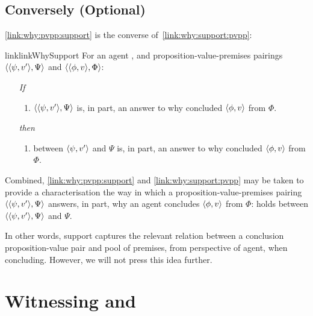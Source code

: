 \subsection[Conversely]{Conversely \hfill (Optional)}

\begin{noteP}
  \autoref{link:why:pvpp:support} is the converse of~\autoref{link:why:support:pvpp}:

  \begin{restatable}[]{link}{linkWhySupport}
    \label{link:why:pvpp:support}
    For an agent \vAgent{}, and proposition-value-premises pairings \(\langle \langle \psi, v' \rangle, \Psi \rangle\) and \(\langle \langle \phi, v \rangle, \Phi \rangle\):
    \begin{itemize}
    \item[\emph{If}]
      \begin{enumerate}[label=\alph*., ref=(\alph*)]
      \item
        \(\langle \langle \psi, v' \rangle, \Psi \rangle\) is, in part, an answer to why \vAgent{} concluded \(\langle \phi, v \rangle\) from \(\Phi\).
      \end{enumerate}
    \item[\emph{then}]
      \begin{enumerate}[label=\alph*., ref=(\alph*), resume]
      \item
         between \(\langle \psi, v' \rangle\) and \(\Psi\) is, in part, an answer to why \vAgent{} concluded \(\langle \phi, v \rangle\) from \(\Phi\).
      \end{enumerate}
    \end{itemize}
    \vspace{-\baselineskip}
  \end{restatable}

  Combined, \autoref{link:why:pvpp:support} and \autoref{link:why:support:pvpp} may be taken to provide a characterisation the way in which a proposition-value-premises pairing \(\langle \langle \psi, v' \rangle, \Psi \rangle\) answers, in part, why an agent concludes \(\langle \phi, v \rangle\) from \(\Phi\):
   holds between \(\langle \langle \psi, v' \rangle, \Psi \rangle\) and \(\Psi\).

  In other words, support captures the relevant relation between a conclusion proposition-value pair and pool of premises, from perspective of agent, when concluding.
  However, we will not press this idea further.
\end{noteP}

\section{Witnessing and \qHow{}}
\label{sec:overview:reasoning}
\label{cha:clar:expand:qHow}

